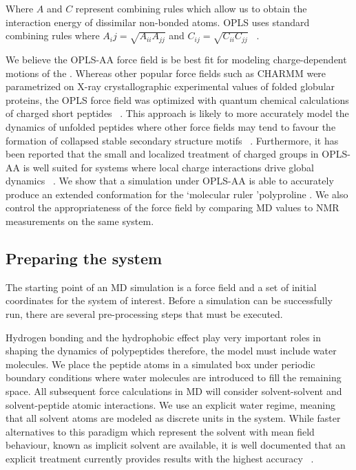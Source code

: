 Where $A$ and $C$ represent combining rules which allow us to obtain the interaction energy of dissimilar non-bonded atoms. OPLS uses standard combining rules where $A_ij = \sqrt{A_{ii}A_{jj}}$ and $C_{ij} = \sqrt{C_{ii}C_{jj}}$ ~\cite{good1970new}.

We believe the OPLS-AA force field is be best fit for modeling charge-dependent motions of the \gct. Whereas other popular force fields such as CHARMM were parametrized on X-ray crystallographic experimental values of folded globular proteins, the OPLS force field was optimized with quantum chemical calculations of charged short peptides ~\cite{kukol2008molecular}. This approach is likely to more accurately model the dynamics of unfolded peptides where other force fields may tend to favour the formation of collapsed stable secondary structure motifs ~\cite{henriques2015molecular, tran2008role}. Furthermore, it has been reported that the small and localized treatment of charged groups in OPLS-AA is well suited for systems where local charge interactions drive global dynamics ~\cite{vitalis2009absinth}. We show that a simulation under OPLS-AA is able to accurately produce an extended conformation for the \lq molecular ruler \rq polyproline . We also control the appropriateness of the force field by comparing MD values to NMR measurements on the same system.



\subsection{Preparing the system}

The starting point of an MD simulation is a force field and a set of initial coordinates for the system of interest. Before a simulation can be successfully run, there are several pre-processing steps that must be executed. 

Hydrogen bonding and the hydrophobic effect play very important roles in shaping the dynamics of polypeptides therefore, the model must include water molecules. We place the peptide atoms in a simulated box under periodic boundary conditions where water molecules are introduced to fill the remaining space. All subsequent force calculations in MD will consider solvent-solvent and solvent-peptide atomic interactions. We use an explicit water regime, meaning that all solvent atoms are modeled as discrete units in the system. While faster alternatives to this paradigm which represent the solvent with mean field behaviour, known as implicit solvent are available, it is well documented that an explicit treatment currently provides results with the highest accuracy ~\cite{onufriev2008implicit, arnold1994evaluation, zhou2003free}. 

